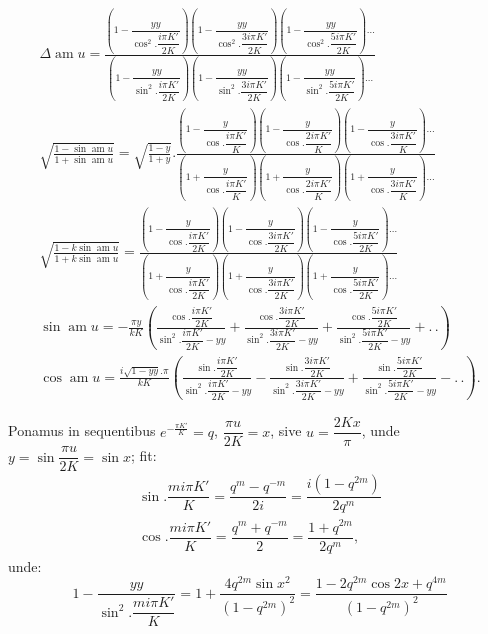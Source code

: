 \documentclass{article}
\begin{document}
\[
\begin{gathered}
\Delta\operatorname{am}u=\frac{\left(1-\dfrac{yy}{\cos^{2}.\dfrac{i\pi K'}{2K}}\right)\left(1-\dfrac{yy}{\cos^{2}.\dfrac{3i\pi K'}{2K}}\right)\left(1-\dfrac{yy}{\cos^{2}.\dfrac{5i\pi K'}{2K}}\right)\ldots}{\left(1-\dfrac{yy}{\sin^{2}.\dfrac{i\pi K'}{2K}}\right)\left(1-\dfrac{yy}{\sin^{2}.\dfrac{3i\pi K'}{2K}}\right)\left(1-\dfrac{yy}{\sin^{2}.\dfrac{5i\pi K'}{2K}}\right)\ldots}
\\[2ex]
\sqrt{\frac{1-\sin\operatorname{am}u}{1+\sin\operatorname{am}u}}=\sqrt{\frac{1-y}{1+y}}.\frac{\left(1-\dfrac{y}{\cos.\dfrac{i\pi K'}{K}}\right)\left(1-\dfrac{y}{\cos.\dfrac{2i\pi K'}{K}}\right)\left(1-\dfrac{y}{\cos.\dfrac{3i\pi K'}{K}}\right)\ldots}{\left(1+\dfrac{y}{\cos.\dfrac{i\pi K'}{K}}\right)\left(1+\dfrac{y}{\cos.\dfrac{2i\pi K'}{K}}\right)\left(1+\dfrac{y}{\cos.\dfrac{3i\pi K'}{K}}\right)\ldots}
\\[2ex]
\sqrt{\frac{1-k\sin\operatorname{am}u}{1+k\sin\operatorname{am}u}}=\frac{\left(1-\dfrac{y}{\cos.\dfrac{i\pi K'}{2K}}\right)\left(1-\dfrac{y}{\cos.\dfrac{3i\pi K'}{2K}}\right)\left(1-\dfrac{y}{\cos.\dfrac{5i\pi K'}{2K}}\right)\ldots}{\left(1+\dfrac{y}{\cos.\dfrac{i\pi K'}{2K}}\right)\left(1+\dfrac{y}{\cos.\dfrac{3i\pi K'}{2K}}\right)\left(1+\dfrac{y}{\cos.\dfrac{5i\pi K'}{2K}}\right)\ldots}
\\[2ex]
\sin\operatorname{am}u=-\frac{\pi y}{kK}\left(\frac{\cos.\dfrac{i\pi K'}{2K}}{\sin^{2}.\dfrac{i\pi K'}{2K}-yy}+\frac{\cos.\dfrac{3i\pi K'}{2K}}{\sin^{2}.\dfrac{3i\pi K'}{2K}-yy}+\frac{\cos.\dfrac{5i\pi K'}{2K}}{\sin^{2}.\dfrac{5i\pi K'}{2K}-yy}+.\,.\right)
\\[2ex]
\cos\operatorname{am}u=\frac{i\sqrt{1-yy}.\pi}{kK}\left(\frac{\sin.\dfrac{i\pi K'}{2K}}{\sin^{2}.\dfrac{i\pi K'}{2K}-yy}-\frac{\sin.\dfrac{3i\pi K'}{2K}}{\sin^{2}.\dfrac{3i\pi K'}{2K}-yy}+\frac{\sin.\dfrac{5i\pi K'}{2K}}{\sin^{2}.\dfrac{5i\pi K'}{2K}-yy}-.\,.\right).
\end{gathered}
\]

Ponamus in sequentibus $e^{-\frac{\pi K'}{K}}=q$, $\dfrac{\pi u}{2K}=x$, sive $u=\dfrac{2Kx}{\pi}$, unde $y=\sin\dfrac{\pi u}{2K}=\sin x$; fit:
\[
\begin{gathered}
\sin.\dfrac{mi\pi K'}{K}=\dfrac{q^{m}-q^{-m}}{2i}=\dfrac{i(1-q^{2m})}{2q^{m}}
\\[2ex]
\cos.\dfrac{mi\pi K'}{K}=\dfrac{q^{m}+q^{-m}}{2}=\dfrac{1+q^{2m}}{2q^{m}},
\end{gathered}
\]
unde:
\[
1-\frac{yy}{\sin^{2}.\dfrac{mi\pi K'}{K}}=1+\frac{4q^{2m}\sin x^{2}}{(1-q^{2m})^{2}}=\frac{1-2q^{2m}\cos 2x+q^{4m}}{(1-q^{2m})^{2}}
\]
\end{document}
